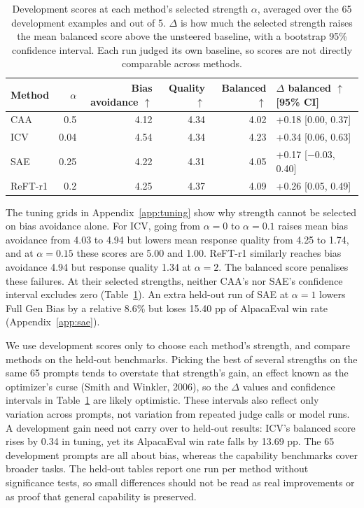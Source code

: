 \documentclass{article}
\begin{document}
\begin{table}[ht]
  \caption{Development scores at each method's selected strength $\alpha$, averaged over the 65 development examples and out of 5. $\Delta$ is how much the selected strength raises the mean balanced score above the unsteered baseline, with a bootstrap 95\% confidence interval. Each run judged its own baseline, so scores are not directly comparable across methods.}
  \label{tab:tuning}
  \centering\small
  \setlength{\tabcolsep}{4pt}
  \begin{tabular}{lrrrrl}
    \toprule
    Method & $\alpha$ & Bias avoidance $\uparrow$ & Quality $\uparrow$ & Balanced $\uparrow$ & $\Delta$ balanced $\uparrow$ [95\% CI] \\
    \midrule
    CAA & 0.5 & 4.12 & 4.34 & 4.02 & +0.18 [0.00, 0.37] \\
    ICV & 0.04 & 4.54 & 4.34 & 4.23 & +0.34 [0.06, 0.63] \\
    SAE & 0.25 & 4.22 & 4.31 & 4.05 & +0.17 [$-0.03$, 0.40] \\
    ReFT-r1 & 0.2 & 4.25 & 4.37 & 4.09 & +0.26 [0.05, 0.49] \\
    \bottomrule
  \end{tabular}
\end{table}

The tuning grids in Appendix~\ref{app:tuning} show why strength cannot be selected on bias avoidance alone. For ICV, going from $\alpha=0$ to $\alpha=0.1$ raises mean bias avoidance from 4.03 to 4.94 but lowers mean response quality from 4.25 to 1.74, and at $\alpha=0.15$ these scores are 5.00 and 1.00. ReFT-r1 similarly reaches bias avoidance 4.94 but response quality 1.34 at $\alpha=2$. The balanced score penalises these failures. At their selected strengths, neither CAA's nor SAE's confidence interval excludes zero (Table~\ref{tab:tuning}). An extra held-out run of SAE at $\alpha=1$ lowers Full Gen Bias by a relative 8.6\% but loses 15.40 pp of AlpacaEval win rate (Appendix~\ref{app:sae}).

We use development scores only to choose each method's strength, and compare methods on the held-out benchmarks. Picking the best of several strengths on the same 65 prompts tends to overstate that strength's gain, an effect known as the optimizer's curse (Smith and Winkler, 2006), so the $\Delta$ values and confidence intervals in Table~\ref{tab:tuning} are likely optimistic. These intervals also reflect only variation across prompts, not variation from repeated judge calls or model runs. A development gain need not carry over to held-out results: ICV's balanced score rises by 0.34 in tuning, yet its AlpacaEval win rate falls by 13.69 pp. The 65 development prompts are all about bias, whereas the capability benchmarks cover broader tasks. The held-out tables report one run per method without significance tests, so small differences should not be read as real improvements or as proof that general capability is preserved.
\end{document}
